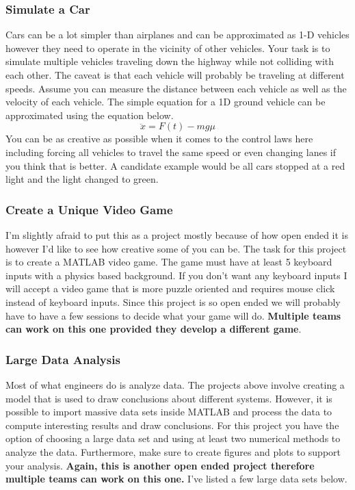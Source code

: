 \subsubsection{Simulate a Car}

Cars can be a lot simpler than airplanes and can be approximated as 1-D
vehicles however they need to operate in the vicinity of other
vehicles. Your task is to simulate multiple vehicles traveling down
the highway while not colliding with each other. The caveat is that
each vehicle will probably be traveling at different speeds. Assume
you can measure the distance between each vehicle as well as the
velocity of each vehicle. The simple equation for a 1D ground
vehicle can be approximated using the equation below.
\begin{equation}
\ddot{x} = F(t) - m g \mu 
\end{equation}
You can be as creative as possible when it comes to the control laws
here including forcing all vehicles to travel the same speed or even
changing lanes if you think that is better. A candidate example would
be all cars stopped at a red light and the light changed to green. 

\subsubsection{Create a Unique Video Game}

I'm slightly afraid to put this as a project mostly because of how
open ended it is however I'd like to see how creative some of you can
be. The task for this project is to create a MATLAB video game. The
game must have at least 5 keyboard inputs with a 
physics based background. If you don't want any keyboard inputs I will
accept a video game that is more puzzle oriented and requires mouse
click instead of keyboard inputs. Since this project is so open ended we will
probably have to have a few sessions to decide what your game will
do. {\bf Multiple teams can work on this one provided they develop a
  different game}.

\subsubsection{Large Data Analysis} 

Most of what engineers do is analyze data. The projects above involve
creating a model that is used to draw conclusions about different
systems. However, it is possible to import massive data sets inside
MATLAB and process the data to compute interesting results and draw
conclusions. For this project you have the option of choosing a large
data set and using at least two numerical methods to analyze the
data. Furthermore, make sure to create figures and plots to support
your analysis. {\bf Again, this is another open ended project therefore
multiple teams can work on this one.} I've listed a few large data sets
below.

